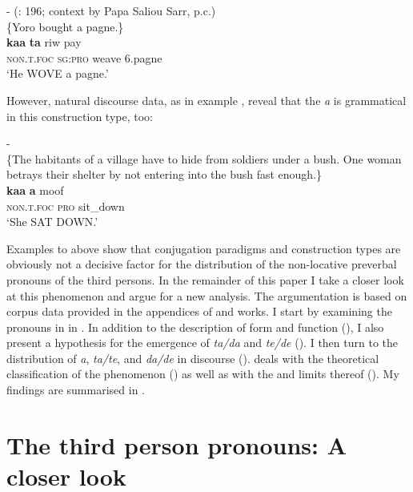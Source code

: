 \documentclass[output=paper
,newtxmath
,modfonts
,nonflat]{langsci/langscibook}
\begin{document}
\ea\label{ex:apel:7}{- (\citealt{Faye1979}: 196; context by Papa Saliou Sarr,   p.c.)}\\
{\-\hspace{0.5cm}\{Yoro bought a pagne.\}}\\
\gll   \textbf{kaa} \textbf{ta} riw pay\\
     \textsc{non.t.foc} \textsc{sg:pro} weave \textsc{6.}pagne\\
\glt ‘He WOVE a pagne.’ 
\z

However, natural discourse data, as in example , reveal that the  \textit{a} is grammatical in this construction type, too:


\ea\label{ex:apel:8}
{- \citep[276]{Faye1979}}\\
{\-\hspace{0.5cm}\{The habitants of a village have to hide from soldiers under a bush. One woman betrays their shelter by not entering into the bush fast enough.\}}\\
\gll   \textbf{kaa} \textbf{a} moof\\
     \textsc{non.t.foc} \textsc{pro} sit\textsc{\_}down \\
\glt ‘She SAT DOWN.’
\z

Examples  to  above show that conjugation paradigms and construction types are obviously not a decisive factor for the distribution of the non-locative preverbal  pronouns of the third persons. In the remainder of this paper I take a closer look at this phenomenon and argue for a new analysis. The argumentation is based on corpus data provided in the appendices of  and  works. I start by examining the  pronouns in  in . In addition to the description of form and function (), I also present a hypothesis for the emergence of \textit{ta/da} and \textit{te/de} (). I then turn to the distribution of \textit{a}, \textit{ta/te}, and \textit{da/de} in discourse ().  deals with the theoretical classification of the phenomenon () as well as with the  and limits thereof (). My findings are summarised in .

\section{The third person pronouns: A closer look}\label{sec:apel:2}
\end{document}
